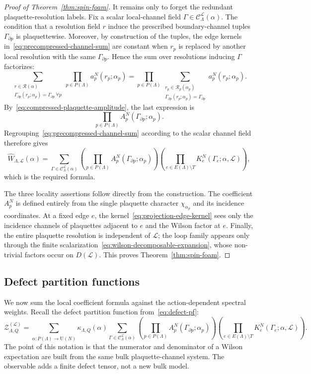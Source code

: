 \documentclass[11pt,a4paper,reqno]{article}
\theoremstyle{definition}
\theoremstyle{remark}
\newcommand\U{{\mathrm U}}
\newcommand\Lc{{\mathcal{L}}}
\begin{document}
\begin{proof}[Proof of Theorem~\ref{thm:spin-foam}]
It remains only to forget the redundant plaquette-resolution labels. Fix a scalar local-channel field $\Gamma\in\mathcal C^\Lc_\Lambda(\alpha)$. The condition that a resolution field $r$ induce the prescribed boundary-channel tuples $\Gamma_{\partial p}$ is plaquettewise. Moreover, by construction of the tuples, the edge kernels in~\eqref{eq:precompressed-channel-sum} are constant when $r_p$ is replaced by another local resolution with the same $\Gamma_{\partial p}$. Hence the sum over resolutions inducing $\Gamma$ factorizes:
\[
\sum_{\substack{r\in\mathcal R(\alpha)\\
\Gamma_{\partial p}(r_p;\alpha_p)=\Gamma_{\partial p}\ \forall p}}
\prod_{p\in P(\Lambda)}a_p^N(r_p;\alpha_p)
=
\prod_{p\in P(\Lambda)}
\sum_{\substack{r_p\in\mathcal R_p(\alpha_p)\\
\Gamma_{\partial p}(r_p;\alpha_p)=\Gamma_{\partial p}}}
a_p^N(r_p;\alpha_p).
\]
By~\eqref{eq:compressed-plaquette-amplitude}, the last expression is
\[
\prod_{p\in P(\Lambda)}A_p^N(\Gamma_{\partial p};\alpha_p).
\]
Regrouping~\eqref{eq:precompressed-channel-sum} according to the scalar channel field therefore gives
\[
\widehat W_{\Lambda,\Lc}(\alpha)
=\sum_{\Gamma\in\mathcal C^\Lc_\Lambda(\alpha)}
\left(\prod_{p\in P(\Lambda)}A_p^N(\Gamma_{\partial p};\alpha_p)\right)
\left(\prod_{e\in E(\Lambda)\setminus T}K_e^N(\Gamma_e;\alpha,\Lc)\right),
\]
which is the required formula.

The three locality assertions follow directly from the construction. The coefficient $A_p^N$ is defined entirely from the single plaquette character $\chi_{\alpha_p}$ and its incidence coordinates. At a fixed edge $e$, the kernel~\eqref{eq:projection-edge-kernel} sees only the incidence channels of plaquettes adjacent to $e$ and the Wilson factor at $e$. Finally, the entire plaquette resolution is independent of $\Lc$; the loop family appears only through the finite scalarization~\eqref{eq:wilson-decomposable-expansion}, whose non-trivial factors occur on $D(\Lc)$. This proves Theorem~\ref{thm:spin-foam}.
\end{proof}

\subsection{Defect partition functions}

We now sum the local coefficient formula against the action-dependent spectral weights. Recall the defect partition function from~\eqref{eq:defect-pf}:
\[
\mathcal Z_{\Lambda,Q}^{(\Lc)}
=\sum_{\alpha:P(\Lambda)\to\widehat{\U(N)}}\kappa_{\Lambda,Q}(\alpha)
\sum_{\Gamma\in\mathcal C^\Lc_\Lambda(\alpha)}
\left(\prod_{p\in P(\Lambda)}A_p^N(\Gamma_{\partial p};\alpha_p)\right)
\left(\prod_{e\in E(\Lambda)\setminus T}K_e^N(\Gamma_e;\alpha,\Lc)\right).
\]
The point of this notation is that the numerator and denominator of a Wilson expectation are built from the same bulk plaquette-channel system. The observable adds a finite defect tensor, not a new bulk model.
\end{document}
